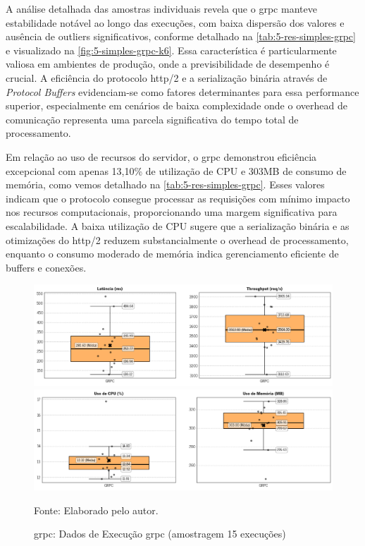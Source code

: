 A análise detalhada das amostras individuais revela que o \gls{grpc} manteve estabilidade notável ao longo das execuções, com baixa dispersão dos valores e ausência de outliers significativos, conforme detalhado na \autoref{tab:5-res-simples-grpc} e visualizado na \autoref{fig:5-simples-grpc-k6}. Essa característica é particularmente valiosa em ambientes de produção, onde a previsibilidade de desempenho é crucial. A eficiência do protocolo \acrshort{http}/2 e a serialização binária através de \textit{Protocol Buffers} evidenciam-se como fatores determinantes para essa performance superior, especialmente em cenários de baixa complexidade onde o overhead de comunicação representa uma parcela significativa do tempo total de processamento.

Em relação ao uso de recursos do servidor, o \gls{grpc} demonstrou eficiência excepcional com apenas 13,10\% de utilização de CPU e 303MB de consumo de memória, como vemos detalhado na \autoref{tab:5-res-simples-grpc}. Esses valores indicam que o protocolo consegue processar as requisições com mínimo impacto nos recursos computacionais, proporcionando uma margem significativa para escalabilidade. A baixa utilização de CPU sugere que a serialização binária e as otimizações do \acrshort{http}/2 reduzem substancialmente o overhead de processamento, enquanto o consumo moderado de memória indica gerenciamento eficiente de buffers e conexões.

\begin{figure}[H]
    \caption{\acrshort{grpc}: Dados de Execução \gls{grpc} (amostragem 15 execuções)}
    \label{fig:5-simples-grpc-k6}
    \centering
    \includegraphics[width=1\linewidth]{imagens//resultados/5-resultados-simples-grpc-k6.png}
    \includegraphics[width=1\linewidth]{imagens//resultados/5-resultados-simples-grpc-prometheus.png}    
    {\par \raggedright \footnotesize Fonte: Elaborado pelo autor.\par}
\end{figure}




